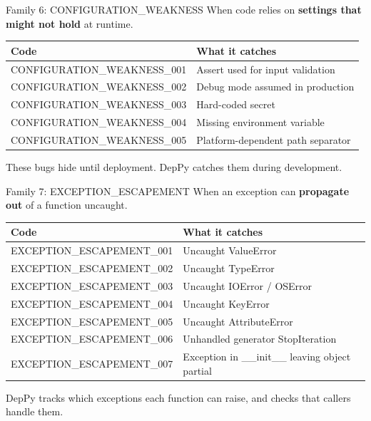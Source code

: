 \documentclass[aspectratio=169,10pt]{beamer}
\begin{document}
\begin{frame}{Family 6: CONFIGURATION\_WEAKNESS}
When code relies on \textbf{settings that might not hold} at runtime.
\vspace{0.3em}
{\scriptsize
\begin{tabular}{@{}ll@{}}
\textbf{Code} & \textbf{What it catches} \\
\hline
CONFIGURATION\_WEAKNESS\_001 & Assert used for input validation \\
CONFIGURATION\_WEAKNESS\_002 & Debug mode assumed in production \\
CONFIGURATION\_WEAKNESS\_003 & Hard-coded secret \\
CONFIGURATION\_WEAKNESS\_004 & Missing environment variable \\
CONFIGURATION\_WEAKNESS\_005 & Platform-dependent path separator \\
\end{tabular}}
\vspace{0.3em}
These bugs hide until deployment. DepPy catches them during development.
\end{frame}

\begin{frame}{Family 7: EXCEPTION\_ESCAPEMENT}
When an exception can \textbf{propagate out} of a function uncaught.
\vspace{0.3em}
{\scriptsize
\begin{tabular}{@{}ll@{}}
\textbf{Code} & \textbf{What it catches} \\
\hline
EXCEPTION\_ESCAPEMENT\_001 & Uncaught ValueError \\
EXCEPTION\_ESCAPEMENT\_002 & Uncaught TypeError \\
EXCEPTION\_ESCAPEMENT\_003 & Uncaught IOError / OSError \\
EXCEPTION\_ESCAPEMENT\_004 & Uncaught KeyError \\
EXCEPTION\_ESCAPEMENT\_005 & Uncaught AttributeError \\
EXCEPTION\_ESCAPEMENT\_006 & Unhandled generator StopIteration \\
EXCEPTION\_ESCAPEMENT\_007 & Exception in \_\_init\_\_ leaving object partial \\
\end{tabular}}
\vspace{0.3em}
DepPy tracks which exceptions each function can raise, and checks that callers handle them.
\end{frame}
\end{document}
